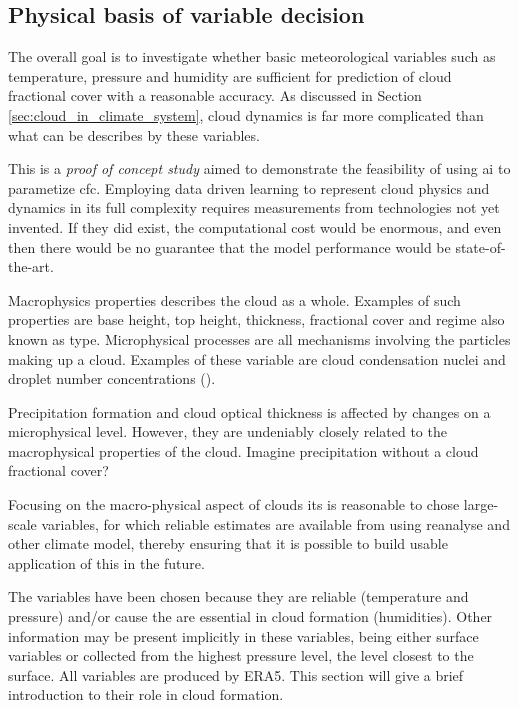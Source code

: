 \subsection{Physical basis of variable decision} \label{sec:ecc}
The overall goal is to investigate whether basic meteorological variables such as temperature, pressure and humidity are sufficient for prediction of cloud fractional cover with a reasonable accuracy. As discussed in Section \ref{sec:cloud_in_climate_system}, cloud dynamics is far more complicated than what can be describes by these variables. 

This is a \textit{proof of concept study} aimed to demonstrate the feasibility of using \acrshort{ai} to parametize \acrshort{cfc}. Employing data driven learning to represent cloud physics and dynamics in its full complexity requires measurements from technologies not yet invented. If they did exist, the computational cost would be enormous, and even then there would be no guarantee that the model performance would be state-of-the-art.

Macrophysics properties describes the cloud as a whole. Examples of such properties are base height, top height, thickness, fractional cover and regime also known as type. Microphysical processes are all mechanisms involving the particles making up a cloud. Examples of these variable are cloud condensation nuclei and droplet number concentrations (\cite{Grabowski2019ModelingBetter}). 

Precipitation formation and cloud optical thickness is affected by changes on a microphysical level. However, they are undeniably closely related to the macrophysical properties of the cloud. Imagine precipitation without a cloud fractional cover? 

Focusing on the macro-physical aspect of clouds its is reasonable to chose large-scale variables, for which reliable estimates are available from using reanalyse and other climate model, thereby ensuring that it is possible to build usable application of this in the future. 

The variables have been chosen because they are reliable (temperature and pressure) and/or cause the are essential in cloud formation (humidities). Other information may be present implicitly in these variables, being either surface variables or collected from the highest pressure level, the level closest to the surface. All variables are produced by ERA5. This section will give a brief introduction to their role in cloud formation. 

